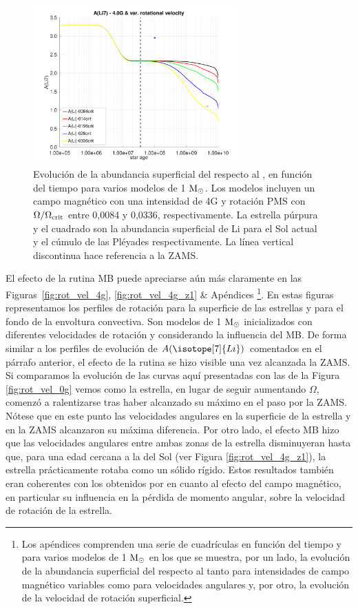 \begin{figure}
    \centering
    \includegraphics[width=0.7\textwidth]{img/paper1/li_var_vel_4_0g.pdf}
	\caption{Evolución de la abundancia superficial del  respecto al , en función del tiempo para varios modelos de 1 $\mathrm{M}_\odot$. Los modelos incluyen un campo magnético con una intensidad de 4G y rotación PMS con $\Omega / \Omega_{\mathrm{crit}}$ entre 0,0084 y 0,0336, respectivamente. La estrella púrpura y el cuadrado son la abundancia superficial de Li para el Sol actual \cite{Asplund2009} y el cúmulo de las Pléyades \cite{Sestito2005} respectivamente. La línea vertical discontinua hace referencia a la ZAMS.}
	\label{fig:li_var_vel_4_0g}
\end{figure}

El efecto de la rutina MB puede apreciarse aún más claramente en las Figuras~\ref{fig:rot_vel_4g}, \ref{fig:rot_vel_4g_z1} \& Apéndices \footnote{Los apéndices comprenden una serie de cuadrículas en función del tiempo y para varios modelos de 1 $\mathrm{M}_\odot$ en los que se muestra, por un lado, la evolución de la abundancia superficial del  respecto al  tanto para intensidades de campo magnético variables como para velocidades angulares y, por otro, la evolución de la velocidad de rotación superficial.}. En estas figuras representamos los perfiles de rotación para la superficie de las estrellas y para el fondo de la envoltura convectiva. Son modelos de 1 $\mathrm{M}_\odot$ inicializados con diferentes velocidades de rotación y considerando la influencia del MB. De forma similar a los perfiles de evolución de $A(\isotope[7]{Li})$ comentados en el párrafo anterior, el efecto de la rutina se hizo visible una vez alcanzada la ZAMS. Si comparamos la evolución de las curvas aquí presentadas con las de la Figura \ref{fig:rot_vel_0g} vemos como la estrella, en lugar de seguir aumentando $\Omega$, comenzó a ralentizarse tras haber alcanzado su máximo en el paso por la ZAMS. Nótese que en este punto las velocidades angulares en la superficie de la estrella y en la ZAMS alcanzaron su máxima diferencia. Por otro lado, el efecto MB hizo que las velocidades angulares entre ambas zonas de la estrella disminuyeran hasta que, para una edad cercana a la del Sol (ver Figura \ref{fig:rot_vel_4g_z1}), la estrella prácticamente rotaba como un sólido rígido. Estos resultados también eran coherentes con los obtenidos por \cite{Eggenberger2010} en cuanto al efecto del campo magnético, en particular su influencia en la pérdida de momento angular, sobre la velocidad de rotación de la estrella.\par

